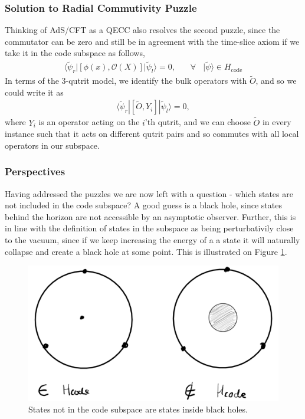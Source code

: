 \documentclass[letter,12pt]{article}
\newcommand{\BO}{\mathcal{O}}
\begin{document}
\subsubsection*{Solution to Radial Commutivity Puzzle}
Thinking of AdS/CFT as a QECC also resolves the second puzzle, since the commutator can be zero and still be in agreement with the time-slice axiom if we take it in the code subspace as follows,
\begin{equation}
	\begin{aligned}
		\langle \tilde \psi_r |\left[\phi(x),\BO(X)\right]|\tilde \psi_l\rangle =0,~~~~~~~~\forall~~~~ |\tilde \psi\rangle\in H_{\text{code}}
	\end{aligned}
\end{equation}
In terms of the 3-qutrit model, we identify the bulk operators with $\tilde O$, and so we could write it as
\begin{equation}
	\begin{aligned}
		\langle \tilde \psi_r |[\tilde O,Y_i]|\tilde \psi_l\rangle =0,
	\end{aligned}
\end{equation}
where $Y_i$ is an operator acting on the $i$'th qutrit, and we can choose $\tilde O$ in every instance such that it acts on different qutrit pairs and so commutes with all local operators in our subspace.
\subsubsection*{Perspectives}
Having addressed the puzzles we are now left with a question - which states are not included in the code subspace? A good guess is a black hole, since states behind the horizon are not accessible by an asymptotic observer. Further, this is in line with the definition of states in the subspace as being perturbativily close to the vacuum, since if we keep increasing the energy of a a state it will naturally collapse and create a black hole at some point. This is illustrated on Figure \ref{fig:adscftfig6}.
\begin{figure}[]
	\centering
	\includegraphics[width=0.7\linewidth]{ADS_CFT_Fig6}
	\caption{States not in the code subspace are states inside black holes.}
	\label{fig:adscftfig6}
\end{figure}
\end{document}
